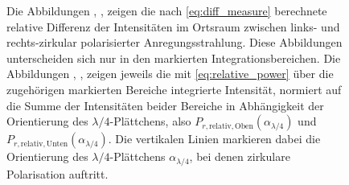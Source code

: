 \documentclass[a4paper, titlepage,  ngerman]{book}
\begin{document}
\begin{figure}
			\caption[Differenz- und Integrationsdaten PSHE Ortsraum]{Die Abbildungen , ,  zeigen die nach \eqref{eq:diff_measure} berechnete relative Differenz der Intensitäten im Ortsraum zwischen links- und rechts-zirkular polarisierter Anregungsstrahlung. Diese Abbildungen unterscheiden sich nur in den markierten Integrationsbereichen. Die Abbildungen , ,  zeigen jeweils die mit \eqref{eq:relative_power} über die zugehörigen markierten Bereiche integrierte Intensität, normiert auf die Summe der Intensitäten beider Bereiche in Abhängigkeit der Orientierung des $\lambda/4$-Plättchens, also $P_{r, \mathrm{relativ}, \mathrm{Oben}}(\alpha_{\lambda/4})$ und $P_{r, \mathrm{relativ}, \mathrm{Unten}}(\alpha_{\lambda/4})$. Die vertikalen Linien markieren dabei die Orientierung des $\lambda/4$-Plättchens $\alpha_{\lambda/4}$, bei denen zirkulare Polarisation auftritt.}
			\label{fig:spin_hall_measure_diff_fp}
		\end{figure}
\end{document}
